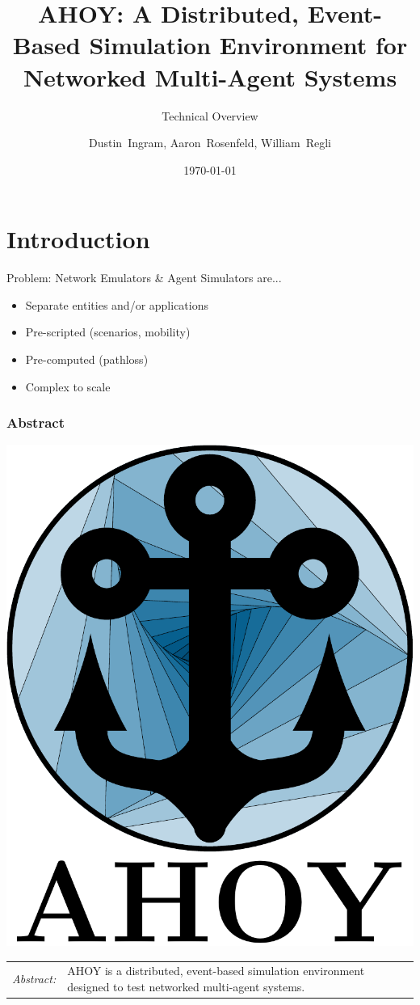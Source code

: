 \documentclass[mathserif,usenames,dvipsnames]{beamer}
\title[AHOY: Slide \insertframenumber/\inserttotalframenumber]{AHOY: A Distributed, Event-Based Simulation Environment for Networked Multi-Agent Systems}
\subtitle{Technical Overview}
\author[Ingram \& Rosenfeld]{ 
Dustin~Ingram, Aaron~Rosenfeld, William~Regli}
\institute{
    Drexel University Department of Computer Science, Philadelphia PA\\
}
\date{\today}
\begin{document}
\frame{\titlepage} 

\section{Introduction}
\frame
{
    Problem: Network Emulators \& Agent Simulators are... 
    \begin{itemize}
        \item Separate entities and/or applications
        \item Pre-scripted (scenarios, mobility)
        \item Pre-computed (pathloss)
        \item Complex to scale
    \end{itemize}
}

\frame
{   
    \frametitle{Abstract}
    \begin{center}
        \includegraphics[scale=.25]{../common/logo.pdf}
    \end{center}
    \begin{tabular}{l p{8cm}}
        \textit{Abstract:} & AHOY is a distributed, event-based simulation environment designed to test networked multi-agent systems. \\
    \end{tabular}
}
\end{document}
